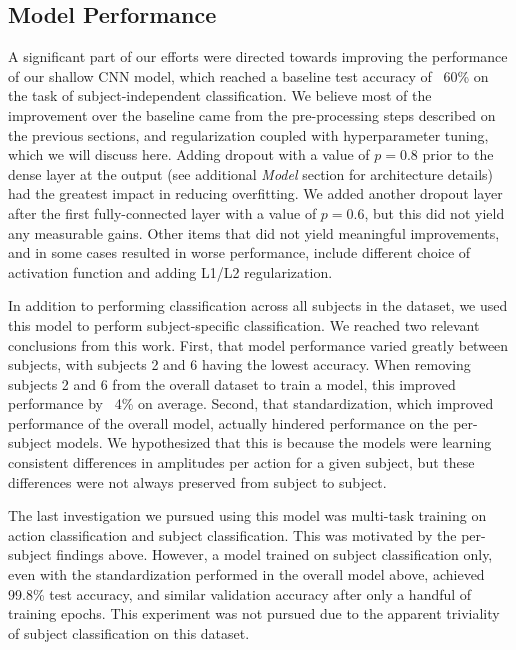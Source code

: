 \documentclass[10pt,twocolumn,letterpaper]{article}
\begin{document}

\subsection{Model Performance}
A significant part of our efforts were directed towards improving the
performance of our shallow CNN model, which reached a baseline test accuracy of
~60\% on the task of subject-independent classification. 
We believe most of the improvement over the baseline came from the
pre-processing steps described on the previous sections, and regularization
coupled with hyperparameter tuning, which we will discuss here.
Adding dropout with a value of $p=0.8$ prior to the dense
layer at the output (see additional \emph{Model} section for architecture
details) had the greatest impact in reducing overfitting. 
We added another dropout layer after the first fully-connected layer with a
value of $p=0.6$, but this did not yield any measurable gains.
Other items that did not yield meaningful improvements, and in some cases
resulted in worse performance, include different choice of activation function
and adding L1/L2 regularization.

In addition to performing classification across all subjects in the dataset, we
used this model to perform subject-specific classification. We reached two
relevant conclusions from this work. First, that model performance varied
greatly between subjects, with subjects 2 and 6 having the lowest accuracy. When
removing subjects 2 and 6 from the overall dataset to train a model, this
improved performance by ~4\% on average.
Second, that standardization, which improved performance of the overall model,
actually hindered performance on the per-subject models. We hypothesized that
this is because the models were learning consistent differences in amplitudes
per action for a given subject, but these differences were not always preserved
from subject to subject.

The last investigation we pursued using this model was multi-task training on
action classification and subject classification. This was motivated by the
per-subject findings above. However, a model trained on subject classification
only, even with the standardization performed in the overall model above,
achieved 99.8\% test accuracy, and similar validation accuracy after only a
handful of training epochs. This experiment was not pursued due to the apparent
triviality of subject classification on this dataset. 
\end{document}
